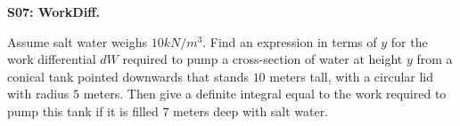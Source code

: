 \documentclass[12pt]{article}
\newcommand{\<}{\left\langle}
\renewcommand{\>}{\right\rangle}
\newcommand{\exerciseHeader}[4]{


  \vspace{0.5em}
  \textbf{#2}
  \vspace{0.5em}

}
\begin{document}
\begin{multicols}{2}
%
%
%
%
%
%
\exerciseHeader{2017 June 27}{S07: WorkDiff.}{
Use the work differential to express the work done in pumping a tank of
liquid as a definite integral.
}{2/3}

Assume salt water weighs \(10kN/m^3\).
Find an expression in terms of \(y\) for the work differential \(dW\)
required to pump a cross-section of water at height \(y\)
from a conical tank pointed downwards that stands \(10\) meters tall, with a
circular lid with radius \(5\) meters.
Then give a definite
integral equal to the work required to pump this tank if it is filled
\(7\) meters deep with salt water.



%

%


\end{multicols}
\end{document}
